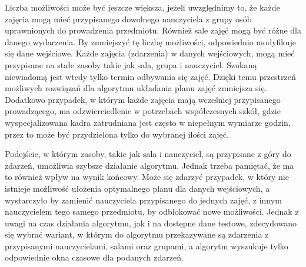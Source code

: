 Liczba możliwości może być jeszcze większa, jeżeli uwzględnimy to, że każde zajęcia mogą mieć przypisanego dowolnego nauczyciela z grupy osób uprawnionych do prowadzenia przedmiotu. Również sale zajęć mogą być różne dla danego wydarzenia. By zmniejszyć tę liczbę możliwości, odpowiednio modyfikuje się dane wejściowe. Każde zajęcia (zdarzenia) w danych wejściowych, mogą mieć przypisane na stałe zasoby takie jak sala, grupa i nauczyciel. Szukaną niewiadomą jest wtedy tylko termin odbywania się zajęć. Dzięki temu przestrzeń możliwych rozwiązań dla algorytmu układania planu zajęć zmniejsza się. Dodatkowo przypadek, w którym każde zajęcia mają wcześniej przypisanego prowadzącego, ma odzwierciedlenie w potrzebach współczesnych szkół, gdzie wyspecjalizowana kadra zatrudniana jest często w niepełnym wymiarze godzin, przez to może być przydzielona tylko do wybranej ilości zajęć.

Podejście, w którym zasoby, takie jak sala i nauczyciel, są przypisane z góry do zdarzeń, umożliwia szybsze działanie algorytmu. Jednak trzeba pamiętać, że ma to również wpływ na wynik końcowy. Może się zdarzyć przypadek, w który nie istnieje możliwość ułożenia optymalnego planu dla danych wejściowych, a wystarczyło by zamienić nauczyciela przypisanego do jednych zajęć, z innym nauczycielem tego samego przedmiotu, by odblokować nowe możliwości. Jednak z uwagi na czas działania algorytmu, jak i na dostępne dane testowe, zdecydowano się wybrać wariant, w którym do algorytmu przekazywane są zdarzenia z przypisanymi nauczycielami, salami oraz grupami, a algorytm wyszukuje tylko odpowiednie okna czasowe dla podanych zdarzeń.